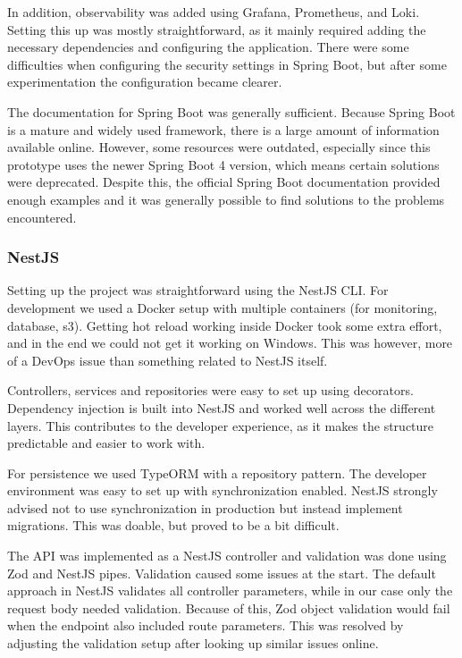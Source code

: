 In addition, observability was added using Grafana, Prometheus, and Loki. Setting this up was mostly straightforward, as it mainly required adding the necessary dependencies and configuring the application.
There were some difficulties when configuring the security settings in Spring Boot, but after some experimentation the configuration became clearer.

The documentation for Spring Boot was generally sufficient.
Because Spring Boot is a mature and widely used framework, there is a large amount of information available online.
However, some resources were outdated, especially since this prototype uses the newer Spring Boot 4 version, which means certain solutions were deprecated.
Despite this, the official Spring Boot documentation provided enough examples and it was generally possible to find solutions to the problems encountered.

\subsubsection{NestJS}
Setting up the project was straightforward using the NestJS CLI.
For development we used a Docker setup with multiple containers (for monitoring, database, s3).
Getting hot reload working inside Docker took some extra effort, and in the end we could not get it working on Windows.
This was however, more of a DevOps issue than something related to NestJS itself.

Controllers, services and repositories were easy to set up using decorators.
Dependency injection is built into NestJS and worked well across the different layers.
This contributes to the developer experience, as it makes the structure predictable and easier to work with.

For persistence we used TypeORM with a repository pattern.
The developer environment was easy to set up with synchronization enabled.
NestJS strongly advised not to use synchronization in production but instead implement migrations.
This was doable, but proved to be a bit difficult.

The API was implemented as a NestJS controller and validation was done using Zod and NestJS pipes.
Validation caused some issues at the start.
The default approach in NestJS validates all controller parameters, while in our case only the request body needed validation.
Because of this, Zod object validation would fail when the endpoint also included route parameters.
This was resolved by adjusting the validation setup after looking up similar issues online.

